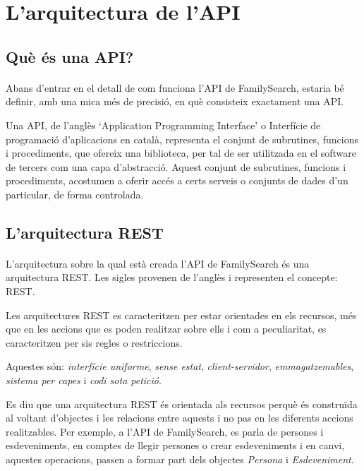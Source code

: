 \section{L'arquitectura de l'\gls{API}}


    \subsection{Què és una \gls{API}?}

    \paragraph{}
    Abans d'entrar en el detall de com funciona l'\gls{API} de FamilySearch, estaria bé definir, amb una mica més de precisió, en què consisteix exactament una API.

    Una \gls{API}, de l'anglès `Application Programming Interface' o Interfície de programació d'aplicacions en català, representa el conjunt de subrutines, funcions i procediments, que ofereix una biblioteca, per tal de ser utilitzada en el software de tercers com una capa d'abstracció. Aquest conjunt de subrutines, funcions i procediments, acostumen a oferir accés a certs serveis o conjunts de dades d'un particular, de forma controlada.


    \subsection{L'arquitectura REST}

    \paragraph{}
    L’arquitectura sobre la qual està creada l’\gls{API} de FamilySearch és una arquitectura REST. Les sigles provenen de l’anglès i representen el concepte: \gls{REST}.

    Les arquitectures \gls{REST} es caracteritzen per estar orientades en els recursos, més que en les accions que es poden realitzar sobre ells i com a peculiaritat, es carac\-te\-rit\-zen per sis regles o restriccions.

    Aquestes són: \emph{interfície uniforme}, \emph{sense estat}, \emph{client-servidor}, \emph{emmagatzemables}, \emph{sistema per capes} i \emph{codi sota petició}.

    Es diu que una arquitectura \gls{REST} és orientada als recursos perquè és cons\-tru\-ï\-da al voltant d’objectes i les relacions entre aquests i no pas en les diferents accions realitzables. Per exemple, a l’\gls{API} de FamilySearch, es parla de persones i esdeveniments, en comptes de llegir persones o crear esdeveniments i en canvi, aquestes operacions, passen a formar part dels objectes \emph{Persona} i \emph{Esdeveniment}.

